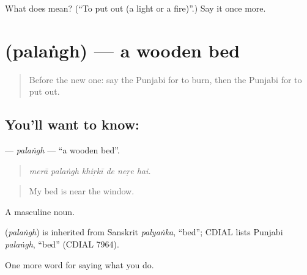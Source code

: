 \begin{tcolorbox}[breakable,colback=teal!4,colframe=teal!35!black,title={Before you move on}]
What does  mean? (\textquotedblleft{}To put out (a light or a fire)\textquotedblright{}.) Say it once more.
\end{tcolorbox}
\section[\texorpdfstring{\pa{ਪਲੰਘ} (palaṅgh)}{ਪਲੰਘ (palaṅgh)}]{ (palaṅgh) — a wooden bed}

\label{lesson:PA-C234-palangh}



\begin{quote}
Before the new one: say the Punjabi for to burn, then the Punjabi for to put out.
\end{quote}

\subsection*{You'll want to know: }
\textbf{} — \emph{palaṅgh} — \textquotedblleft{}a wooden bed\textquotedblright{}.

\begin{quote}
     
\end{quote}

\begin{quote}
\emph{merā palaṅgh khiṛkī de neṛe hai.}
\end{quote}

\begin{quote}
My bed is near the window.
\end{quote}

A masculine noun.

\begin{cousinweb}
\textbf{} (\emph{palaṅgh}) is inherited from Sanskrit \emph{palyaṅka}, \textquotedblleft{}bed\textquotedblright{}; CDIAL lists Punjabi \emph{palaṅgh}, \textquotedblleft{}bed\textquotedblright{} (CDIAL 7964).
\end{cousinweb}

\begin{grammarlens}[title={What you've built}]
One more word for saying what you do.
\end{grammarlens}

